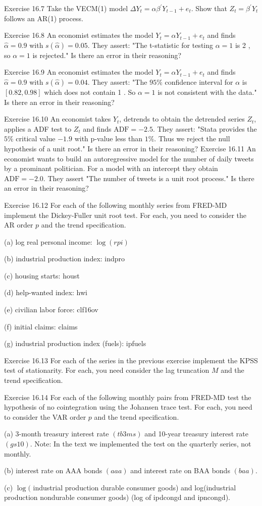 \documentclass[10pt]{article}
\begin{document}
Exercise 16.7 Take the VECM(1) model $\Delta Y_{t}=\alpha \beta^{\prime} Y_{t-1}+e_{t}$. Show that $Z_{t}=\beta^{\prime} Y_{t}$ follows an AR(1) process.

Exercise 16.8 An economist estimates the model $Y_{t}=\alpha Y_{t-1}+e_{t}$ and finds $\widehat{\alpha}=0.9$ with $s(\widehat{\alpha})=0.05$. They assert: "The t-statistic for testing $\alpha=1$ is 2 , so $\alpha=1$ is rejected." Is there an error in their reasoning?

Exercise 16.9 An economist estimates the model $Y_{t}=\alpha Y_{t-1}+e_{t}$ and finds $\widehat{\alpha}=0.9$ with $s(\widehat{\alpha})=0.04$. They assert: "The $95 \%$ confidence interval for $\alpha$ is $[0.82,0.98]$ which does not contain 1 . So $\alpha=1$ is not consistent with the data." Is there an error in their reasoning?

Exercise 16.10 An economist takes $Y_{t}$, detrends to obtain the detrended series $Z_{t}$, applies a ADF test to $Z_{t}$ and finds $\mathrm{ADF}=-2.5$. They assert: "Stata provides the $5 \%$ critical value $-1.9$ with $\mathrm{p}$-value less than $1 \%$. Thus we reject the null hypothesis of a unit root." Is there an error in their reasoning? Exercise 16.11 An economist wants to build an autoregressive model for the number of daily tweets by a prominant politician. For a model with an intercept they obtain $\mathrm{ADF}=-2.0$. They assert "The number of tweets is a unit root process." Is there an error in their reasoning?

Exercise 16.12 For each of the following monthly series from FRED-MD implement the Dickey-Fuller unit root test. For each, you need to consider the AR order $p$ and the trend specification.

(a) log real personal income: $\log (r p i)$

(b) industrial production index: indpro

(c) housing starts: houst

(d) help-wanted index: hwi

(e) civilian labor force: clf16ov

(f) initial claims: claims

(g) industrial production index (fuels): ipfuels

Exercise 16.13 For each of the series in the previous exercise implement the KPSS test of stationarity. For each, you need consider the lag truncation $M$ and the trend specification.

Exercise 16.14 For each of the following monthly pairs from FRED-MD test the hypothesis of no cointegration using the Johansen trace test. For each, you need to consider the VAR order $p$ and the trend specification.

(a) 3-month treasury interest rate $(t b 3 m s)$ and 10-year treasury interest rate $(g s 10)$. Note: In the text we implemented the test on the quarterly series, not monthly.

(b) interest rate on AAA bonds $(a a a)$ and interest rate on BAA bonds $(b a a)$.

(c) $\log ($ industrial production durable consumer goods) and log(industrial production nondurable consumer goods) (log of ipdcongd and ipncongd).
\end{document}
